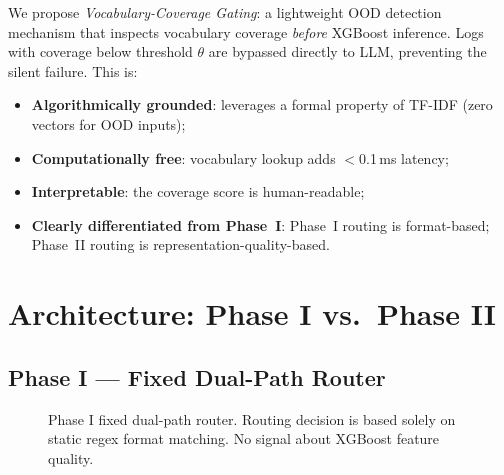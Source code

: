 \documentclass[11pt,conference]{IEEEtran}
\begin{document}
We propose \emph{Vocabulary-Coverage Gating}: a lightweight OOD detection
mechanism that inspects vocabulary coverage \emph{before} XGBoost inference.
Logs with coverage below threshold $\theta$ are bypassed directly to LLM,
preventing the silent failure. This is:
\begin{itemize}
    \item \textbf{Algorithmically grounded}: leverages a formal property of
    TF-IDF (zero vectors for OOD inputs);
    \item \textbf{Computationally free}: vocabulary lookup adds $<$0.1\,ms
    latency;
    \item \textbf{Interpretable}: the coverage score is human-readable;
    \item \textbf{Clearly differentiated from Phase~I}: Phase~I routing is
    format-based; Phase~II routing is representation-quality-based.
\end{itemize}

\section{Architecture: Phase I vs.\ Phase II}

\subsection{Phase I — Fixed Dual-Path Router}

\begin{figure}[!t]
\centering
{}
\caption{Phase I fixed dual-path router. Routing decision is based solely on
static regex format matching. No signal about XGBoost feature quality.}
\label{fig:phase1}
\end{figure}
\end{document}
